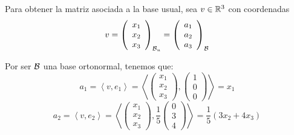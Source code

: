 \begin{ejercicio}
\begin{enumerate}
        Para obtener la matriz asociada a la base usual, sea $v\in \mathbb{R}^3$ con coordenadas
        \begin{equation*}
            v=\left(\begin{array}{c}
                     x_1 \\ x_2 \\ x_3
                \end{array}\right)_{\mathcal{B}_u}
                =\left(\begin{array}{c}
                     a_1 \\ a_2 \\ a_3
                \end{array}\right)_{\mathcal{B}}
        \end{equation*}

        Por ser $\mathcal{B}$ una base ortonormal, tenemos que:
        \begin{equation*}
            a_1 = \left\langle 
                v, e_1\right\rangle
                = \left\langle 
                \left(\begin{array}{c}
                     x_1 \\ x_2 \\ x_3
                \end{array}\right),
                \left(\begin{array}{c}
                     1 \\ 0 \\ 0
                \end{array}\right)
                \right\rangle
                = x_1
        \end{equation*}
        \begin{equation*}
            a_2 = \left\langle 
                v, e_2\right\rangle
                = \left\langle 
                \left(\begin{array}{c}
                     x_1 \\ x_2 \\ x_3
                \end{array}\right),
                \frac{1}{5}
                \left(\begin{array}{c}
                     0 \\ 3 \\ 4
                \end{array}\right)
                \right\rangle
                = \frac{1}{5}(3x_2+4x_3)
        \end{equation*}
        \begin{equation*}

\end{equation*}
\end{enumerate}
\end{ejercicio}
